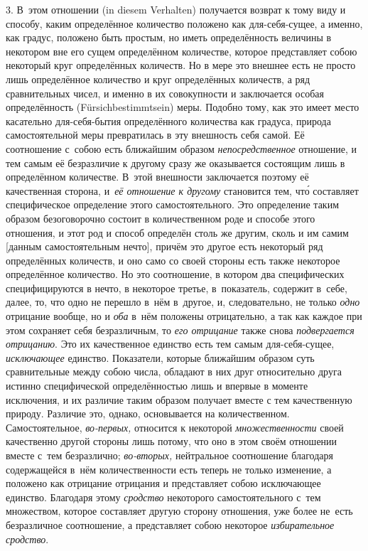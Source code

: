 3. В~этом отношении (in die\-sem Ver\-hal\-ten) получается возврат к тому виду
и способу, каким определённое количество положено как для-себя-сущее, а именно,
как градус, положено быть простым, но иметь определённость величины в некотором
вне его сущем определённом количестве, которое представляет собою некоторый
круг определённых количеств. Но в мере это внешнее есть не просто лишь
определённое количество и круг определённых количеств, а ряд сравнительных
чисел, и именно в их совокупности и заключается особая определённость
(Für\-sich\-bes\-timmt\-sein) меры. Подобно тому, как это имеет место
касательно для-себя-бытия определённого количества как градуса, природа
самостоятельной меры превратилась в эту внешность себя самой. Её соотношение
с~собою есть ближайшим образом {\em непосредственное} отношение, и тем самым её
безразличие к другому сразу же оказывается состоящим лишь в определённом
количестве. В~этой внешности заключается поэтому её качественная сторона,
и~{\em её отношение к другому} становится тем, чт\'{о} составляет специфическое
определение этого самостоятельного. Это определение таким образом безоговорочно
состоит в количественном роде и способе этого отношения, и этот род и способ
определён столь же другим, сколь и им самим [данным самостоятельным нечто],
причём это другое есть некоторый ряд определённых количеств, и оно само со
своей стороны есть также некоторое определённое количество. Но это соотношение,
в котором два специфических специфицируются в нечто, в некоторое третье,
в~показатель, содержит в~себе, далее, то, что одно не перешло в~нём в~другое,
и, следовательно, не только {\em одно} отрицание вообще, но и {\em оба} в~нём
положены отрицательно, а так как каждое при этом сохраняет себя безразличным,
то {\em его отрицание} также снова {\em подвергается отрицанию}. Это их
качественное единство есть тем самым для-себя-сущее, {\em исключающее}
единство. Показатели, которые ближайшим образом суть сравнительные между собою
числа, обладают в них друг относительно друга истинно специфической
определённостью лишь и впервые в моменте исключения, и их различие таким
образом получает вместе с тем качественную природу. Различие это, однако,
основывается на количественном. Самостоятельное, {\em во-первых,} относится к
некоторой {\em множественности} своей качественно другой стороны лишь потому,
что оно в этом своём отношении вместе с~тем безразлично; {\em во-вторых,}
нейтральное соотношение благодаря содержащейся в~нём количественности есть
теперь не только изменение, а положено как отрицание отрицания и представляет
собою исключающее единство. Благодаря этому {\em сродство} некоторого
самостоятельного с~тем множеством, которое составляет другую сторону отношения,
уже более не~есть безразличное соотношение, а представляет собою некоторое
{\em избирательное сродство}.

